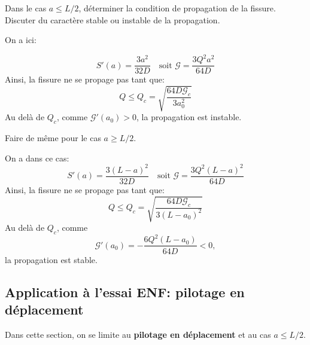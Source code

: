 \begin{questions}
\question Dans le cas $a\leq L/2$, déterminer la condition de propagation de la fissure. Discuter du caractère stable ou instable de la propagation.
\begin{solution}
On a ici:

$$S'(a) = \dfrac{3a^2}{32 D} \quad \text{soit } \mathcal{G}=\dfrac{3Q^2a^2}{64D}$$
Ainsi, la fissure ne se propage pas tant que:
$$Q \leq Q_c = \sqrt{\dfrac{64D\mathcal{G}_c}{3a_0^2}}$$
Au delà de $Q_c$, comme $\mathcal{G}'(a_0) >0$, la propagation est instable.
\end{solution}
\question Faire de même pour le cas $a \geq L/2$.
\begin{solution}
On a dans ce cas:
$$S'(a) = \dfrac{3(L-a)^2}{32D} \quad \text{soit } \mathcal{G}=\dfrac{3Q^2(L-a)^2}{64D}$$
Ainsi, la fissure ne se propage pas tant que:
$$Q \leq Q_c = \sqrt{\dfrac{64D\mathcal{G}_c}{3(L-a_0)^2}}$$
Au delà de $Q_c$, comme 
$$\mathcal{G}'(a_0) =  -\dfrac{6Q^2(L-a_0)}{64D}<0,$$ la propagation est stable.
\end{solution}
\end{questions}

\subsection{Application à l'essai ENF: pilotage en déplacement}

Dans cette section, on se limite au \textbf{pilotage en déplacement} et au cas $a\leq L/2$.

